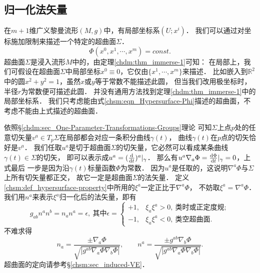 
\subsection{归一化法矢量}\label{chsm:sec_Phi-n}
在$m+1$维广义黎曼流形$(M,g)$中，有局部坐标系$(U;x^i)$．
我们可以通过对坐标施加限制来描述一个特定的超曲面$\Sigma$．
\begin{equation}\label{chsm:eqn_Hypersurface-Phi}
    \Phi(x^0,x^1,\cdots,x^{m}) =const .
\end{equation}
超曲面$\Sigma$是浸入流形$M$中的，由定理\ref{chdm:thm_immerse-1}可知：
在局部上，我们可假设在超曲面$\Sigma$中局部坐标$x^0\equiv 0$，它仅由$\{x^1,\cdots,x^m\}$来描述．
比如嵌入到$\mathbb{R}^2$中的圆$x^2+y^2=1$，虽然$x$或$y$等于常数不能描述此圆，
但当我们改用极坐标时，半径$r$为常数便可描述此圆．
并没有通用方法找到定理\ref{chdm:thm_immerse-1}中的局部坐标系．
我们只考虑能由式\eqref{chsm:eqn_Hypersurface-Phi}描述的超曲面，不考虑不能由上式描述的超曲面．

依照\S \ref{chdm:sec_One-Parameter-Transformations-Groups}理论
可知$\Sigma$上点$p$处的任意切矢量$v^a\in T_p \Sigma$在局部都会对应一条积分曲线$\gamma(t)$，
曲线$\gamma(t)$在$p$点的切矢恰好是$v^a$．
我们任取$u^a$是切于超曲面$\Sigma$的切矢量，它必然可以看成某条曲线$\gamma(t)\in \Sigma$的切矢，
即可以表示成$u^a=(\frac{{\rm d}}{{\rm d}t})^a|_{\gamma}$．
那么有$u^a\nabla_a \Phi= \frac{{\rm d}\Phi}{{\rm d}t}|_{\gamma} =0$，上式最后
一步是因为沿$\gamma(t)$标量函数$\Phi$为常数．
因为$u^a$是任取的，这说明$\nabla^a \Phi$与$\Sigma$上所有切矢量都正交，
故它一定是超曲面$\Sigma$的法矢量．
定义\ref{chsm:def_hypersurface-property}中所用的$\xi^a$一定正比于$\nabla^a \Phi$，
不妨取$\xi^a=\nabla^a\Phi$．
我们用${n}^a$来表示$\xi^a$归一化后的法矢量，即有
\begin{equation}\label{chsm:eqn_unit-normal}
    g_{ab} {n}^a {n}^b=n_a n^a = \epsilon , \ \text{其中} \epsilon=
    \begin{cases}
        +1, & {\xi}_a {\xi}^a>0, \ \text{类时或正定度规}; \\
        -1, & {\xi}_a {\xi}^a<0, \ \text{类空超曲面}.
    \end{cases}
\end{equation}
不难求得
\begin{equation}\label{chsm:eqn_unit-normal-Phi}
    n_a=\frac{\pm \nabla_a \Phi}{\sqrt{|g^{ab}\nabla_a \Phi\nabla_b \Phi|} },     \qquad
    n^a=\frac{\pm g^{ab}\nabla_b \Phi}{\sqrt{|g^{ab}\nabla_a \Phi\nabla_b \Phi|} } .
\end{equation}
超曲面的定向请参考\S\ref{chsm:sec_induced-VE}．

